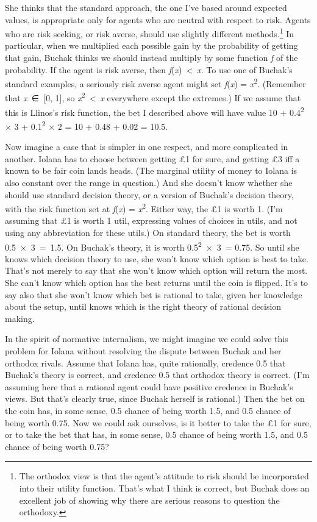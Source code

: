 \documentclass[
  10pt,
  letterpaper,
  twoside]{scrbook}
\begin{document}
She thinks that the standard approach, the one I've based around
expected values, is appropriate only for agents who are neutral with
respect to risk. Agents who are risk seeking, or risk averse, should use
slightly different methods.\footnote{The orthodox view is that the
  agent's attitude to risk should be incorporated into their utility
  function. That's what I think is correct, but Buchak does an excellent
  job of showing why there are serious reasons to question the
  orthodoxy.} In particular, when we multiplied each possible gain by
the probability of getting that gain, Buchak thinks we should instead
multiply by some function \emph{f} of the probability. If the agent is
risk averse, then \emph{f}(\emph{x})~\textless~\emph{x}. To use one of
Buchak's standard examples, a seriously risk averse agent might set
\emph{f}(\emph{x}) = \emph{x}\textsuperscript{2}. (Remember that
\emph{x}~∈~{[}0, 1{]}, so \emph{x}\textsuperscript{2}~\textless~\emph{x}
everywhere except the extremes.) If we assume that this is {Llinos}'s
risk function, the bet I described above will have value 10 +
0.4\textsuperscript{2} × 3 + 0.1\textsuperscript{2} × 2 = 10 + 0.48 +
0.02 = 10.5.

Now imagine a case that is simpler in one respect, and more complicated
in another. {Iolana} has to choose between getting £1 for sure, and
getting £3 iff a known to be fair coin lands heads. (The marginal
utility of money to Iolana is also constant over the range in question.)
And she doesn't know whether she should use standard decision theory, or
a version of Buchak's decision theory, with the risk function set at
\emph{f}(\emph{x}) = \emph{x}\textsuperscript{2}. Either way, the £1 is
worth 1. (I'm assuming that £1 is worth 1 util, expressing values of
choices in utils, and not using any abbreviation for these utils.) On
standard theory, the bet is worth 0.5~×~3~=~1.5. On Buchak's theory, it
is worth 0.5\textsuperscript{2}~×~3~= 0.75. So until she knows which
decision theory to use, she won't know which option is best to take.
That's not merely to say that she won't know which option will return
the most. She can't know which option has the best returns until the
coin is flipped. It's to say also that she won't know which bet is
rational to take, given her knowledge about the setup, until knows which
is the right theory of rational decision making.

In the spirit of normative internalism, we might imagine we could solve
this problem for {Iolana} without resolving the dispute between Buchak
and her orthodox rivals. Assume that {Iolana} has, quite rationally,
credence 0.5 that Buchak's theory is correct, and credence 0.5 that
orthodox theory is correct. (I'm assuming here that a rational agent
could have positive credence in Buchak's views. But that's clearly true,
since Buchak herself is rational.) Then the bet on the coin has, in some
sense, 0.5 chance of being worth 1.5, and 0.5 chance of being worth
0.75. Now we could ask ourselves, is it better to take the £1 for sure,
or to take the bet that has, in some sense, 0.5 chance of being worth
1.5, and 0.5 chance of being worth 0.75?
\end{document}
